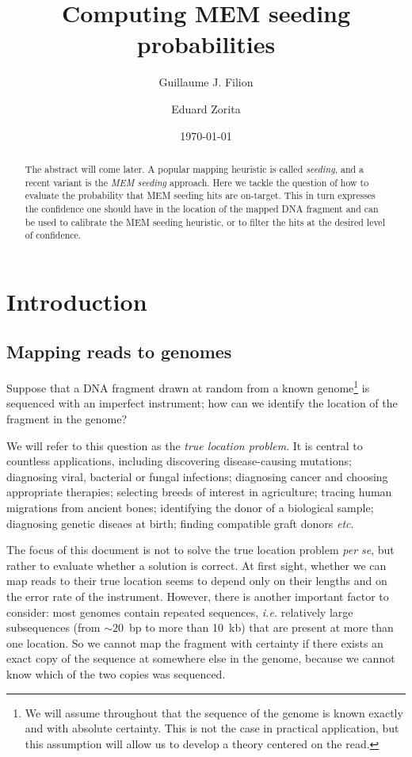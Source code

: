 \documentclass{article}
\title{Computing MEM seeding probabilities}
\author[1,2]{Guillaume J. Filion}
\author[1,2]{Eduard Zorita}
\affil[1]{Genome Architecture, Gene Regulation, Stem Cells and Cancer
Programme, Center for Genomic Regulation (CRG), The Barcelona Institute of
Science and Technology, Dr. Aiguader 88, Barcelona 08003, Spain.}
\affil[2]{University Pompeu Fabra, Doctor Aiguader, 08003 Barcelona,
Spain.}
\date{\today}
\begin{document}
\maketitle

\begin{abstract}
The abstract will come later.
A popular mapping heuristic is called \emph{seeding}, and a recent variant
is the \emph{MEM seeding} approach. Here we tackle the question of how to
evaluate the probability that MEM seeding hits are on-target. This in turn
expresses the confidence one should have in the location of the mapped DNA
fragment and can be used to calibrate the MEM seeding heuristic, or to
filter the hits at the desired level of confidence.
\end{abstract}



\section{Introduction}

\subsection{Mapping reads to genomes}

Suppose that a DNA fragment drawn at random from a known
genome\footnote{We will assume throughout that the sequence of the genome
is known exactly and with absolute certainty. This is not the case in
practical application, but this assumption will allow us to develop a
theory centered on the read.} is sequenced with an imperfect instrument;
how can we identify the location of the fragment in the genome?

We will refer to this question as the \emph{true location problem}.
It is central to countless applications, including discovering
disease-causing mutations; diagnosing viral, bacterial or fungal
infections; diagnosing cancer and choosing appropriate therapies;
selecting breeds of interest in agriculture; tracing human migrations from
ancient bones; identifying the donor of a biological sample; diagnosing
genetic diseaes at birth; finding compatible graft donors \textit{etc}.

The focus of this document is not to solve the true location problem
\textit{per se}, but rather to evaluate whether a solution is correct. At
first sight, whether we can map reads to their true location seems to
depend only on their lengths and on the error rate of the instrument.
However, there is another important factor to consider: most genomes
contain repeated sequences, \textit{i.e.} relatively large subsequences
(from $\sim20$~bp to more than 10~kb) that are present at more than one
location. So we cannot map the fragment with certainty if there exists an
exact copy of the sequence at somewhere else in the genome, because we
cannot know which of the two copies was sequenced.
\end{document}
